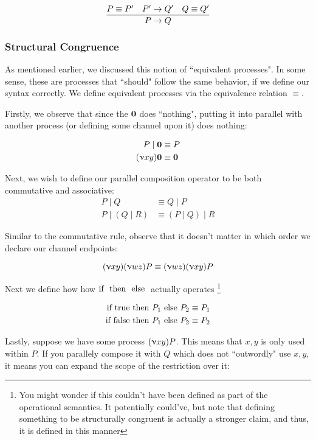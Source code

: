 $$
\frac{P \equiv P' \quad P' \rightarrow Q' \quad Q \equiv Q'}{P \rightarrow Q}
$$

\subsubsection{Structural Congruence}
As mentioned earlier, we discussed this notion of ``equivalent processes". In some sense, these are processes that ``should" follow the same behavior, if we define our syntax correctly. We define equivalent processes via the equivalence relation $\equiv$.

Firstly, we observe that since the $\textbf{0}$ does ``nothing", putting it into parallel with another process (or defining some channel upon it) does nothing:

\begin{align*}
P \mid \textbf{0} &\equiv P \\
(\upnu xy) \textbf{0} &\equiv \textbf{0}
\end{align*}

Next, we wish to define our parallel composition operator to be both commutative and associative:
\begin{align*}
P \mid Q &\equiv Q \mid P \\
P \mid (Q \mid R) &\equiv (P \mid Q) \mid R
\end{align*}

Similar to the commutative rule, observe that it doesn't matter in which order we declare our channel endpoints:

$$
(\upnu xy)(\upnu wz)P \equiv (\upnu wz)(\upnu xy)P
$$

Next we define how how $\text{if }  \text{ then }  \text{ else }$ actually operates \footnote{You might wonder if this couldn't have been defined as part of the operational semantics. It potentially could've, but note that defining something to be structurally congruent is actually a stronger claim, and thus, it is defined in this manner}

\begin{align*}
\text{if } \text{true} \text{ then } P_1 \text{ else } P_2 &\equiv P_1 \\
\text{if } \text{false} \text{ then } P_1 \text{ else } P_2 &\equiv P_2
\end{align*}

Lastly, suppose we have some process $(\upnu xy)P$. This means that $x,y$ is only used within $P$. If you parallely compose it with $Q$ which does not ``outwordly" use $x,y$, it means you can expand the scope of the restriction over it:


